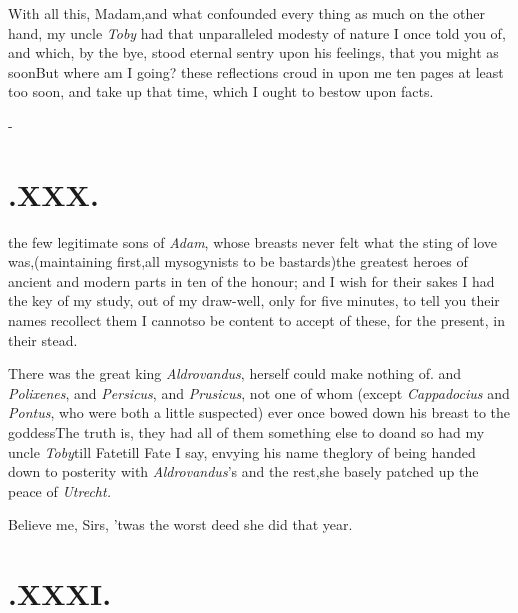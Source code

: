 \documentclass{article}
\begin{document}
\enlargethispage\baselineskip
With all this, Madam,\tsk and what confounded every thing as
much on the other hand, my uncle \textit{Toby} had that unparalleled
modesty of nature I once told you of, and which, by the bye,
stood\break
eternal sentry upon his feelings, that you might as soon\tsh But where am I going?
these reflections croud in upon me ten pages at least too soon, and
take up that time, which I ought to bestow upon facts.

\etp{}\eject
\null\kern-\baselineskip
\section{.\enspace XXX.}

 the few legitimate sons of
\textit{Adam}, whose breasts never felt what the sting of love
was,\tsh (maintaining first,\break all mysogynists to be
bastards)\tsk the greatest heroes of ancient and modern
parts in ten of the honour; and I wish\break
for their sakes I had the key of my\break
study, out of my draw-well, only for\break
five minutes, to tell you their names\tsk\break
recollect them I cannot\tsk so be content\break
to accept of these, for the present, in\break
their stead.\tsh

There was the great king \textit{Aldrovandus},\break
{}
\break
herself could make nothing of.\tsh{}
and \textit{Polixenes}, and \textit{Persicus}, and \textit{Prusicus}, not one
of whom (except \textit{Cappadocius} and \textit{Pontus}, who were both
a little suspected) ever once bowed down his breast to the
goddess\tsh The truth is, they had all of them something
else to do\tsk and so had my uncle \textit{Toby}\tsk till
Fate\tsk till Fate I say, envying his name the\break glory of being
handed down to posterity with \textit{Aldrovandus}’s and the
rest,\tsk she basely patched up the peace of \textit{Utrecht.}

\tsh Believe me, Sirs, ’twas the worst deed she
did that year.

\setlength{\baselineskip}{12.7826pt}
\section{.\enspace XXXI.}
\end{document}
